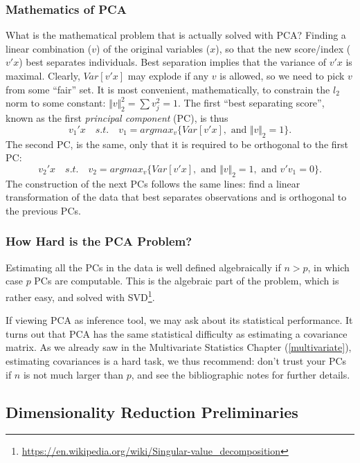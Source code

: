 \documentclass[]{book}
\renewcommand{\href}[2]{#2\footnote{\url{#1}}}
\theoremstyle{definition}
\theoremstyle{definition}
\theoremstyle{definition}
\theoremstyle{remark}
\begin{document}
\hypertarget{mathematics-of-pca}{%
\subsubsection{Mathematics of PCA}\label{mathematics-of-pca}}

What is the mathematical problem that is actually solved with PCA?
Finding a linear combination (\(v\)) of the original variables (\(x\)), so that the new score/index (\(v'x\)) best separates individuals.
Best separation implies that the variance of \(v'x\) is maximal.
Clearly, \(Var[v'x]\) may explode if any \(v\) is allowed, so we need to pick \(v\) from some ``fair'' set.
It is most convenient, mathematically, to constrain the \(l_2\) norm to some constant: \(\Vert v \Vert^2_2=\sum v_j^2=1\).
The first ``best separating score'', known as the first \emph{principal component} (PC), is thus
\[v_1'x \quad s.t. \quad v_1=argmax_{v}\{Var[v'x], \text{ and } \Vert v \Vert_2=1  \} .\]
The second PC, is the same, only that it is required to be orthogonal to the first PC:
\[v_2'x \quad s.t. \quad v_2=argmax_{v}\{Var[v'x], \text{ and } \Vert v \Vert_2=1, \text{ and } v'v_1=0 \} .\]
The construction of the next PCs follows the same lines: find a linear transformation of the data that best separates observations and is orthogonal to the previous PCs.

\hypertarget{how-hard-is-the-pca-problem}{%
\subsubsection{How Hard is the PCA Problem?}\label{how-hard-is-the-pca-problem}}

Estimating all the PCs in the data is well defined algebraically if \(n>p\), in which case \(p\) PCs are computable.
This is the algebraic part of the problem, which is rather easy, and solved with \href{https://en.wikipedia.org/wiki/Singular-value_decomposition}{SVD}.

If viewing PCA as inference tool, we may ask about its statistical performance.
It turns out that PCA has the same statistical difficulty as estimating a covariance matrix.
As we already saw in the Multivariate Statistics Chapter (\ref{multivariate}), estimating covariances is a hard task, we thus recommend: don't trust your PCs if \(n\) is not much larger than \(p\), and see the bibliographic notes for further details.

\hypertarget{dimensionality-reduction-preliminaries}{%
\subsection{Dimensionality Reduction Preliminaries}\label{dimensionality-reduction-preliminaries}}
\end{document}
